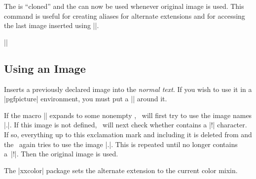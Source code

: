 \begin{command}{\pgfaliasimage{}}
  The  is ``cloned'' and the  can now be used whenever original image is used. This
  command is useful for creating aliases for alternate extensions
  and for accessing the last image inserted using |\pgfimage|.

  \example ||
\end{command}


\subsection{Using an Image}

\begin{command}{\pgfuseimage{}}
  Inserts a previously declared image into the \emph{normal text}. If
  you wish to use it in a |{pgfpicture}| environment, you must put a
  |\pgftext| around it.

  If the macro |\pgfalternateextension| expands to some nonempty
  , \pgfname\ will first try to use the image
  names |.|. If this
  image is not defined, \pgfname\ will next check whether  contains a |!| character. If so, everything up to this
  exclamation mark and including it is deleted from  and the \pgfname\ again tries to use the image |.|. This is repeated until
   no longer contains a~|!|. Then the
  original image is used.

  The |xxcolor| package sets the alternate extension to the current
  color mixin. 

\begin{codeexample}[]
\begin{pgfpicture}

  \pgfpathrectangle{\pgfpoint{1cm}{5cm}}{\pgfpoint{1cm}{1cm}}
  \pgfpathrectangle{\pgfpoint{1cm}{3cm}}{\pgfpoint{1cm}{1cm}}
  \pgfpathrectangle{\pgfpoint{1cm}{1cm}}{\pgfpoint{1cm}{1cm}}
\end{pgfpicture}
\end{codeexample}


\end{command}
